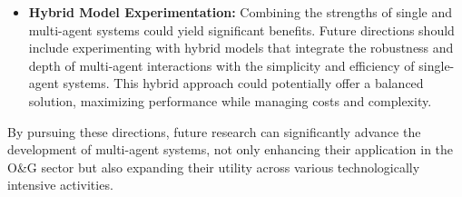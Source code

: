 \begin{itemize}
                \item \textbf{Hybrid Model Experimentation:}
                    Combining the strengths of single and multi-agent systems could yield significant benefits. Future directions should include experimenting with hybrid models that integrate the robustness and depth of multi-agent interactions with the simplicity and efficiency of single-agent systems. This hybrid approach could potentially offer a balanced solution, maximizing performance while managing costs and complexity.
                    

            \end{itemize}
            
            By pursuing these directions, future research can significantly advance the development of multi-agent systems, not only enhancing their application in the O\&G sector but also expanding their utility across various technologically intensive activities.
            
